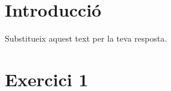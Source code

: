 



\section{Introducci\'{o}}
Substitueix aquest text per la teva resposta.

\section{Exercici 1}


